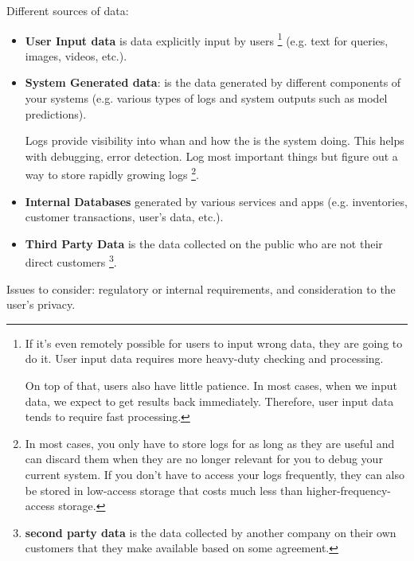Different sources of data:
\begin{itemize}
    \item \textbf{User Input data} is data explicitly input by users
    \footnote{
        If it's even remotely possible for users to input wrong data,
        they are going to do it. User input data requires more
        heavy-duty checking and processing.
    
        On top of that, users also have little patience. In most
        cases, when we input data, we expect to get results back
        immediately. Therefore, user input data tends to require
        fast processing.
    }
    (e.g. text for queries, images, videos, etc.).
    
    \item \textbf{System Generated data}: is the data generated by
    different components of your systems (e.g. various types of logs
    and system outputs such as model predictions).

    Logs provide visibility into whan and how the is the system doing.
    This helps with debugging, error detection. Log most important
    things but figure out a way to store rapidly growing logs
    \footnote{
        In most cases, you only have to store logs for as long as
        they are useful and can discard them when they are no longer
        relevant for you to debug your current system. If you don't
        have to access your logs frequently, they can also be stored
        in low-access storage that costs much less than
        higher-frequency-access storage.
    }.

    \item \textbf{Internal Databases} generated by various services
    and apps (e.g. inventories, customer transactions, user's data,
    etc.). 
    
    \item \textbf{Third Party Data} is the data collected on the
    public who are not their direct customers
    \footnote{
        \textbf{second party data} is the data collected by another
        company on their own customers that they make available
        based on some agreement.
    }.
\end{itemize}
Issues to consider: regulatory or internal requirements, and
consideration to the user's privacy.



